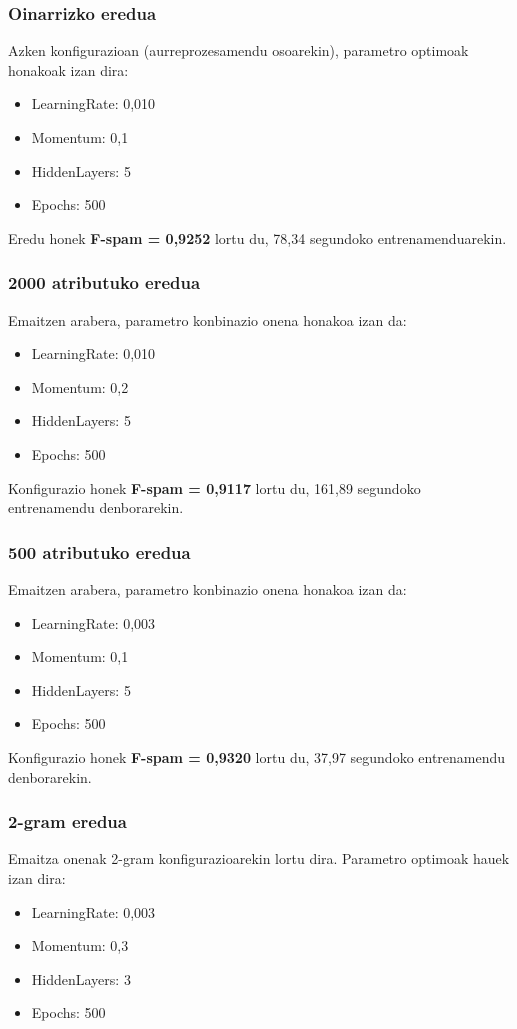 \documentclass[12pt, a4paper]{article}
\begin{document}
\subsubsection*{Oinarrizko eredua}
Azken konfigurazioan (aurreprozesamendu osoarekin), parametro optimoak honakoak izan dira:
\begin{itemize}
    \item LearningRate: 0,010
    \item Momentum: 0,1
    \item HiddenLayers: 5
    \item Epochs: 500
\end{itemize}

Eredu honek \textbf{F-spam = 0,9252} lortu du, 78,34 segundoko entrenamenduarekin.

\subsubsection*{2000 atributuko eredua}
Emaitzen arabera, parametro konbinazio onena honakoa izan da:
\begin{itemize}
    \item LearningRate: 0,010
    \item Momentum: 0,2
    \item HiddenLayers: 5
    \item Epochs: 500
\end{itemize}

Konfigurazio honek \textbf{F-spam = 0,9117} lortu du, 161,89 segundoko entrenamendu denborarekin.

\subsubsection*{500 atributuko eredua}
Emaitzen arabera, parametro konbinazio onena honakoa izan da:
\begin{itemize}
    \item LearningRate: 0,003
    \item Momentum: 0,1
    \item HiddenLayers: 5
    \item Epochs: 500
\end{itemize}

Konfigurazio honek \textbf{F-spam = 0,9320} lortu du, 37,97 segundoko entrenamendu denborarekin.

\subsubsection*{2-gram eredua}
Emaitza onenak 2-gram konfigurazioarekin lortu dira. Parametro optimoak hauek izan dira:
\begin{itemize}
    \item LearningRate: 0,003
    \item Momentum: 0,3
    \item HiddenLayers: 3
    \item Epochs: 500
\end{itemize}
\end{document}
